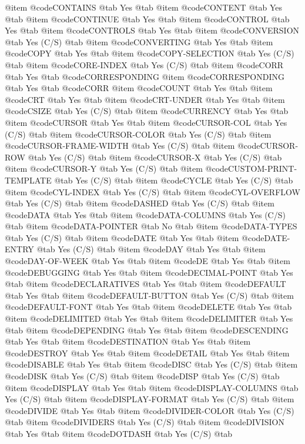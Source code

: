 @item @code{CONTAINS} @tab Yes @tab 
@item @code{CONTENT} @tab Yes @tab 
@item @code{CONTINUE} @tab Yes @tab 
@item @code{CONTROL} @tab Yes @tab 
@item @code{CONTROLS} @tab Yes @tab 
@item @code{CONVERSION} @tab Yes	(C/S) @tab 
@item @code{CONVERTING} @tab Yes @tab 
@item @code{COPY} @tab Yes @tab 
@item @code{COPY-SELECTION} @tab Yes	(C/S) @tab 
@item @code{CORE-INDEX} @tab Yes	(C/S) @tab 
@item @code{CORR} @tab Yes @tab @code{CORRESPONDING}
@item @code{CORRESPONDING} @tab Yes @tab @code{CORR}
@item @code{COUNT} @tab Yes @tab 
@item @code{CRT} @tab Yes @tab 
@item @code{CRT-UNDER} @tab Yes @tab 
@item @code{CSIZE} @tab Yes	(C/S) @tab 
@item @code{CURRENCY} @tab Yes @tab 
@item @code{CURSOR} @tab Yes @tab 
@item @code{CURSOR-COL} @tab Yes	(C/S) @tab 
@item @code{CURSOR-COLOR} @tab Yes	(C/S) @tab 
@item @code{CURSOR-FRAME-WIDTH} @tab Yes	(C/S) @tab 
@item @code{CURSOR-ROW} @tab Yes	(C/S) @tab 
@item @code{CURSOR-X} @tab Yes	(C/S) @tab 
@item @code{CURSOR-Y} @tab Yes	(C/S) @tab 
@item @code{CUSTOM-PRINT-TEMPLATE} @tab Yes	(C/S) @tab 
@item @code{CYCLE} @tab Yes	(C/S) @tab 
@item @code{CYL-INDEX} @tab Yes	(C/S) @tab 
@item @code{CYL-OVERFLOW} @tab Yes	(C/S) @tab 
@item @code{DASHED} @tab Yes	(C/S) @tab 
@item @code{DATA} @tab Yes @tab 
@item @code{DATA-COLUMNS} @tab Yes	(C/S) @tab 
@item @code{DATA-POINTER} @tab No @tab 
@item @code{DATA-TYPES} @tab Yes	(C/S) @tab 
@item @code{DATE} @tab Yes @tab 
@item @code{DATE-ENTRY} @tab Yes	(C/S) @tab 
@item @code{DAY} @tab Yes @tab 
@item @code{DAY-OF-WEEK} @tab Yes @tab 
@item @code{DE} @tab Yes @tab 
@item @code{DEBUGGING} @tab Yes @tab 
@item @code{DECIMAL-POINT} @tab Yes @tab 
@item @code{DECLARATIVES} @tab Yes @tab 
@item @code{DEFAULT} @tab Yes @tab 
@item @code{DEFAULT-BUTTON} @tab Yes	(C/S) @tab 
@item @code{DEFAULT-FONT} @tab Yes @tab 
@item @code{DELETE} @tab Yes @tab 
@item @code{DELIMITED} @tab Yes @tab 
@item @code{DELIMITER} @tab Yes @tab 
@item @code{DEPENDING} @tab Yes @tab 
@item @code{DESCENDING} @tab Yes @tab 
@item @code{DESTINATION} @tab Yes @tab 
@item @code{DESTROY} @tab Yes @tab 
@item @code{DETAIL} @tab Yes @tab 
@item @code{DISABLE} @tab Yes @tab 
@item @code{DISC} @tab Yes	(C/S) @tab 
@item @code{DISK} @tab Yes	(C/S) @tab 
@item @code{DISP} @tab Yes	(C/S) @tab 
@item @code{DISPLAY} @tab Yes @tab 
@item @code{DISPLAY-COLUMNS} @tab Yes	(C/S) @tab 
@item @code{DISPLAY-FORMAT} @tab Yes	(C/S) @tab 
@item @code{DIVIDE} @tab Yes @tab 
@item @code{DIVIDER-COLOR} @tab Yes	(C/S) @tab 
@item @code{DIVIDERS} @tab Yes	(C/S) @tab 
@item @code{DIVISION} @tab Yes @tab 
@item @code{DOTDASH} @tab Yes	(C/S) @tab 
